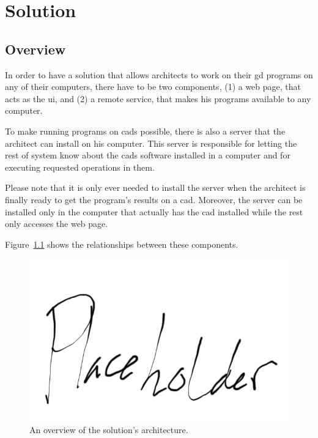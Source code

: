 
\chapter{Solution}
\label{chapter:solution}


\section{Overview}
In order to have a solution that allows architects to work on their \gls{gd} programs on any of their computers, there have to be two components, (1) a web page, that acts as the \gls{ui}, and (2) a remote service, that makes his programs available to any computer.

To make running programs on \glspl{cad} possible, there is also a server that the architect can install on his computer.
This server is responsible for letting the rest of system know about the \glspl{cad} software installed in a computer and for executing requested operations in them.

Please note that it is only ever needed to install the server when the architect is finally ready to get the program's results on a \gls{cad}.
Moreover, the server can be installed only in the computer that actually has the \gls{cad} installed while the rest only accesses the web page.

Figure~\ref{fig:arch:overview} shows the relationships between these components.

\begin{figure}
  \centering
  \includegraphics[width=12cm]{./images/architecture_overview}
  \caption{An overview of the solution's architecture.}
  \label{fig:arch:overview}
\end{figure}

